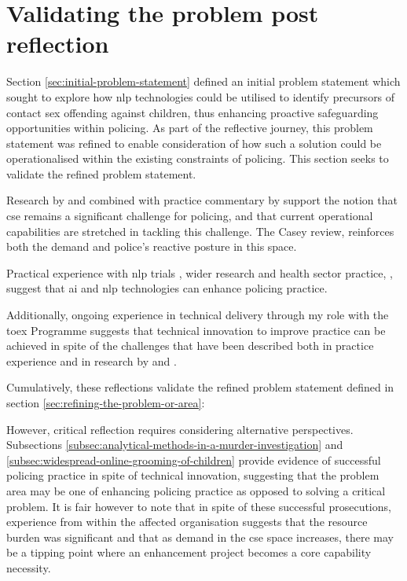 \documentclass[12pt,a4paper,oneside]{report}
\begin{document}
\section{Validating the problem post reflection} 
\label{sec:validating-the-problem-post-reflection}
Section \ref{sec:initial-problem-statement} defined an initial problem statement which sought to explore how \gls{nlp} technologies could be utilised to identify precursors of contact sex offending against children, thus enhancing proactive safeguarding opportunities within policing.  As part of the reflective journey, this problem statement was refined to enable consideration of how such a solution could be operationalised within the existing constraints of policing.  This section seeks to validate the refined problem statement.

Research by \citet{choi2024digital} and \citet{finkelhor2024prevalence} combined with practice commentary by \citet{npcc2024ucol} support the notion that \gls{cse} remains a significant challenge for policing, and that current operational capabilities are stretched in tackling this challenge.  The Casey review, \citep{casey2025gbcse} reinforces both the demand and police's reactive posture in this space.  

Practical experience with \gls{nlp} trials \citep{swansea2023dragon}, wider research \citep{ngai2025natural} and health sector practice, \citep{aiknowledge2023nhs}, suggest that \gls{ai} and \gls{nlp} technologies can enhance policing practice.

Additionally, ongoing experience in technical delivery through my role with the \gls{toex} Programme suggests that technical innovation to improve practice can be achieved in spite of the challenges that have been described both in practice experience and in research by \citet{laufs2022technological} and \citet{thompson2021missed}.

Cumulatively, these reflections validate the refined problem statement defined in section \ref{sec:refining-the-problem-or-area}:

However, critical reflection requires considering alternative perspectives.  Subsections \ref{subsec:analytical-methods-in-a-murder-investigation} and \ref{subsec:widespread-online-grooming-of-children} provide evidence of successful policing practice in spite of technical innovation, suggesting that the problem area may be one of enhancing policing practice as opposed to solving a critical problem.  It is fair however to note that in spite of these successful prosecutions, experience from within the affected organisation suggests that the resource burden was significant and that as demand in the \gls{cse} space increases, there may be a tipping point where an enhancement project becomes a core capability necessity.
\end{document}
